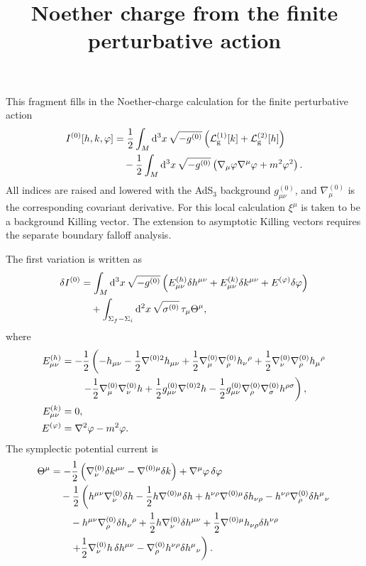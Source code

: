 \documentclass[11pt]{article}
\title{Noether charge from the finite perturbative action}
\author{}
\date{}
\newcommand{\dd}{\mathrm{d}}
\newcommand{\Lg}{\mathcal{L}_{\mathrm g}}
\begin{document}
\maketitle

This fragment fills in the Noether-charge calculation for the finite
perturbative action
\begin{align}
  I^{(0)}[h,k,\varphi]
  &=\frac12\int_M\dd^3x\,\sqrt{-g^{(0)}}
    \left(\Lg^{(1)}[k]+\Lg^{(2)}[h]\right)
    \notag\\
  &\quad
    -\frac12\int_M\dd^3x\,\sqrt{-g^{(0)}}
    \left(\nabla_\mu\varphi\nabla^\mu\varphi+m^2\varphi^2\right).
\end{align}
All indices are raised and lowered with the AdS$_3$ background
$g^{(0)}_{\mu\nu}$, and $\nabla^{(0)}_\mu$ is the corresponding covariant
derivative. For this local calculation $\xi^\mu$ is taken to be a background
Killing vector. The extension to asymptotic Killing vectors requires the
separate boundary falloff analysis.

The first variation is written as
\begin{align}
  \delta I^{(0)}
  &=\int_M\dd^3x\,\sqrt{-g^{(0)}}
    \left(
      E^{(h)}_{\mu\nu}\delta h^{\mu\nu}
      +E^{(k)}_{\mu\nu}\delta k^{\mu\nu}
      +E^{(\varphi)}\delta\varphi
    \right) \notag\\
  &\quad
    +\int_{\Sigma_f-\Sigma_i}
    \dd^2x\,\sqrt{\sigma^{(0)}}\,\tau_\mu\Theta^\mu,
\end{align}
where
\begin{align}
  E^{(h)}_{\mu\nu}
  &=-\frac12\left(
    -h_{\mu\nu}
    -\frac12\nabla^{(0)2}h_{\mu\nu}
    +\frac12\nabla^{(0)}_\mu\nabla^{(0)}_\rho h_\nu{}^\rho
    +\frac12\nabla^{(0)}_\nu\nabla^{(0)}_\rho h_\mu{}^\rho
    \right. \notag\\
  &\qquad\left.
    -\frac12\nabla^{(0)}_\mu\nabla^{(0)}_\nu h
    +\frac12g^{(0)}_{\mu\nu}\nabla^{(0)2}h
    -\frac12g^{(0)}_{\mu\nu}
      \nabla^{(0)}_\rho\nabla^{(0)}_\sigma h^{\rho\sigma}
    \right),\\
  E^{(k)}_{\mu\nu}&=0,\\
  E^{(\varphi)}&=\nabla^2\varphi-m^2\varphi.
\end{align}
The symplectic potential current is
\begin{align}
  \Theta^\mu
  &=-\frac12\left(
    \nabla^{(0)}_\nu\delta k^{\mu\nu}
    -\nabla^{(0)\mu}\delta k
    \right)
    +\nabla^\mu\varphi\,\delta\varphi \notag\\
  &\quad
    -\frac12\left(
    h^{\mu\nu}\nabla^{(0)}_\nu\delta h
    -\frac12h\nabla^{(0)\mu}\delta h
    +h^{\nu\rho}\nabla^{(0)\mu}\delta h_{\nu\rho}
    -h^{\nu\rho}\nabla^{(0)}_\rho\delta h^\mu{}_\nu
    \right. \notag\\
  &\qquad
    -h^{\mu\nu}\nabla^{(0)}_\rho\delta h_\nu{}^\rho
    +\frac12h\nabla^{(0)}_\nu\delta h^{\mu\nu}
    +\frac12\nabla^{(0)\mu}h_{\nu\rho}\delta h^{\nu\rho}
    \notag\\
  &\qquad\left.
    +\frac12\nabla^{(0)}_\nu h\,\delta h^{\mu\nu}
    -\nabla^{(0)}_\rho h^{\nu\rho}\delta h^\mu{}_\nu
    \right).
\end{align}
\end{document}
